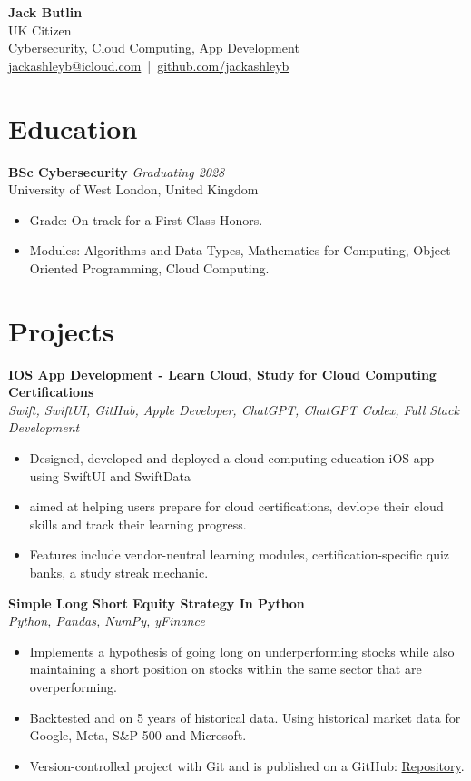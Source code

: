 \documentclass[9.5pt,a4paper]{article}
\begin{document}
\begin{center}
    {\LARGE \textbf{Jack Butlin}} \\[6pt]
    UK Citizen \\[6pt]
    Cybersecurity, Cloud Computing, App Development \\[6pt]  
    \href{mailto:jackashleyb@icloud.com}{jackashleyb@icloud.com} \,|\, 
    \href{https://github.com/jackashleyb}{github.com/jackashleyb}
\end{center}

\section*{Education}
\textbf{BSc Cybersecurity} \hfill \textit{Graduating 2028 } \\
University of West London, United Kingdom
\begin{itemize}
    \item Grade: On track for a First Class Honors. 
    \item Modules: Algorithms and Data Types, Mathematics for Computing, Object Oriented Programming, Cloud Computing.
\end{itemize}

\section*{Projects}

\textbf{IOS App Development - Learn Cloud, Study for Cloud Computing Certifications} \\
\textit{Swift, SwiftUI, GitHub, Apple Developer, ChatGPT, ChatGPT Codex, Full Stack Development}
\begin{itemize}
    \item Designed, developed and deployed a cloud computing education iOS app using SwiftUI and SwiftData
    \item aimed at helping users prepare for cloud certifications, devlope their cloud skills and track their learning progress.
    \item Features include vendor-neutral learning modules, certification-specific quiz banks, a study streak mechanic.
\end{itemize}

\textbf{Simple Long Short Equity Strategy In Python} \\
\textit{Python, Pandas, NumPy, yFinance}
\begin{itemize}
    \item Implements a hypothesis of going long on underperforming stocks while also maintaining a short position on stocks within the same sector that are overperforming.
    \item Backtested and on 5 years of historical data. Using historical market data for Google, Meta, S\&P 500 and Microsoft.
    \item Version-controlled project with Git and is published on a GitHub: \href{https://github.com/jackashleyb/simple-long-short-equity-strategy-in-python}{Repository}.
\end{itemize}
\end{document}
